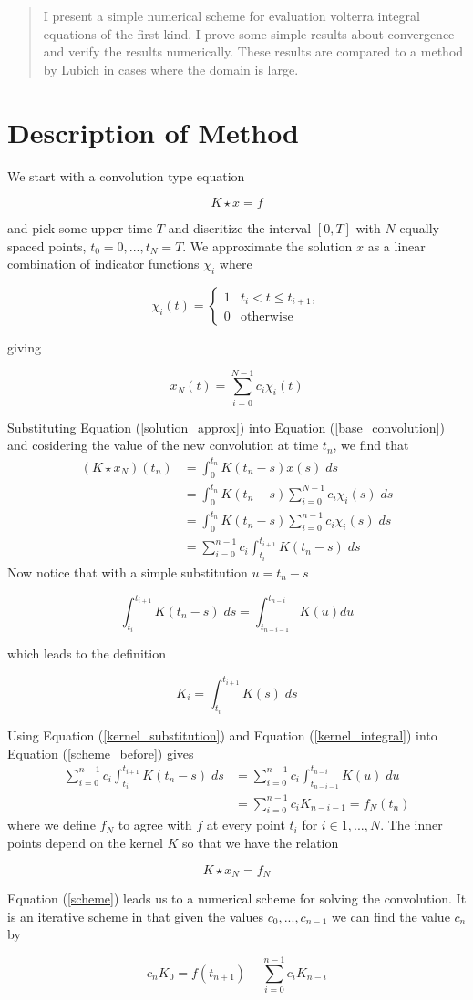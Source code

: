 \documentclass[11pt]{article}
\numberwithin{equation}{section}
\theoremstyle{definition}
\newcommand{\eqn}[2]{
	\begin{equation}
		\label{#1}
		#2
	\end{equation}
}
\newcommand{\eqr}[1]{Equation (\ref{#1})}
\begin{document}
\maketitle
\begin{abstract}
I present a simple numerical scheme for evaluation volterra integral
equations of the first kind. I prove some simple results about
convergence and verify the results numerically. These results are
compared to a method by Lubich in cases where the domain is large.
\end{abstract}
\setcounter{tocdepth}{1}
\tableofcontents
\lstlistoflistings
\listoftables
\section{Description of Method}
We start with a convolution type equation
\eqn{base_convolution}{
	K \star x = f
}
and pick some upper time $T$ and discritize the interval $[0, T]$ with $N$
equally spaced points, $t_0 = 0, ..., t_N = T$. We approximate the solution $x$
as a linear combination of indicator functions $\chi_i$ where
\eqn{indicator_defn}{
	\chi_i(t)
	=
	\left\{
	\begin{array}{ll}
		1 & t_{i} < t \leq t_{i+1} , \\
		0 & \text{otherwise}
	\end{array}
	\right.
}
giving
\eqn{solution_approx}{
	x_N(t) = \sum_{i=0}^{N-1} c_i \chi_i(t)
}
Substituting \eqr{solution_approx} into \eqr{base_convolution} and cosidering
the value of the new convolution at time $t_n$, we find that
\begin{align}
\nonumber            	(K \star x_N)(t_n)
                     		&= \int_0^{t_n} K(t_n - s)x(s)\; ds \\
\nonumber            		&= \int_0^{t_n} K(t_n - s) \sum_{i=0}^{N-1} c_i \chi_i(s)\; ds \\
\nonumber            		&= \int_0^{t_n} K(t_n - s) \sum_{i=0}^{n-1} c_i \chi_i(s)\; ds \\
\label{scheme_before}		&= \sum_{i=0}^{n-1} c_i \int_{t_i}^{t_{i+1}} K(t_n - s)\; ds
\end{align}
Now notice that with a simple substitution $u = t_n - s$
\eqn{kernel_substitution}{
	\int_{t_i}^{t_{i+1}}K(t_n - s)\; ds = \int_{t_{n-i-1}}^{t_{n-i}} K(u) du
}
which leads to the definition
\eqn{kernel_integral}{
	K_i = \int_{t_i}^{t_{i+1}} K(s)\; ds
}
Using \eqr{kernel_substitution} and \eqr{kernel_integral} into \eqr{scheme_before}
gives
\begin{align}
\nonumber     	\sum_{i=0}^{n-1} c_i \int_{t_i}^{t_{i+1}} K(t_n - s)\; ds
              		&= \sum_{i=0}^{n-1} c_i \int_{t_{n-i-1}}^{t_{n-i}} K(u)\; du\\
\label{scheme}		&= \sum_{i=0}^{n-1} c_i K_{n-i-1} = f_N(t_n)
\end{align}
where we define $f_N$ to agree with $f$ at every point $t_i$ for $i \in 1, ..., N$.
The inner points depend on the kernel $K$ so that we have the relation
\eqn{approx_relation}{
	K \star x_N = f_N
}
\eqr{scheme} leads us to a numerical scheme for solving the convolution. It is
an iterative scheme in that given the values $c_0, ..., c_{n-1}$ we can find
the value $c_n$ by
\eqn{specific_term}{
	c_nK_0 = f(t_{n+1}) - \sum_{i=0}^{n-1} c_i K_{n-i}
}
\end{document}

